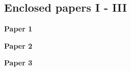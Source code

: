 \backmatter
\cleardoublepage
{}
\pagestyle{empty}

\begin{titlepage}
   \huge
   \chapter{Enclosed papers I - III}
\end{titlepage}

\begin{titlepage}
  \LARGE
  \textbf{Paper 1}
\end{titlepage}

\begin{titlepage}
\end{titlepage}





\begin{titlepage}
  \LARGE
  \textbf{Paper 2}
\end{titlepage}

\begin{titlepage}
\end{titlepage}





\begin{titlepage}
  \LARGE
  \textbf{Paper 3}
\end{titlepage}

\begin{titlepage}
\end{titlepage}




